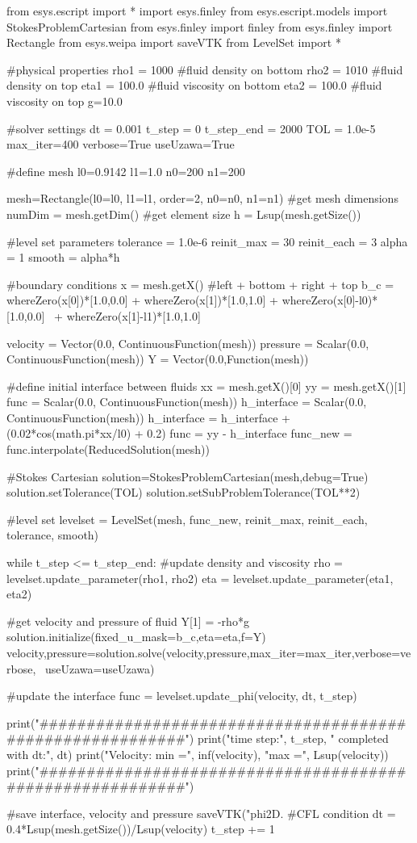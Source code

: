 \begin{python}

from esys.escript import *
import esys.finley
from esys.escript.models import StokesProblemCartesian
from esys.finley import finley
from esys.finley import Rectangle
from esys.weipa import saveVTK
from LevelSet import *

#physical properties
rho1 = 1000		#fluid density on bottom
rho2 = 1010		#fluid density on top
eta1 = 100.0		#fluid viscosity on bottom
eta2 = 100.0		#fluid viscosity on top
g=10.0

#solver settings
dt = 0.001
t_step = 0
t_step_end = 2000
TOL = 1.0e-5
max_iter=400
verbose=True
useUzawa=True

#define mesh
l0=0.9142
l1=1.0
n0=200      
n1=200

mesh=Rectangle(l0=l0, l1=l1, order=2, n0=n0, n1=n1)
#get mesh dimensions
numDim = mesh.getDim()
#get element size
h = Lsup(mesh.getSize())

#level set parameters
tolerance = 1.0e-6
reinit_max = 30
reinit_each = 3
alpha = 1
smooth = alpha*h 

#boundary conditions
x = mesh.getX()
#left + bottom + right + top
b_c = whereZero(x[0])*[1.0,0.0] + whereZero(x[1])*[1.0,1.0] + whereZero(x[0]-l0)*[1.0,0.0] \
      + whereZero(x[1]-l1)*[1.0,1.0]

velocity = Vector(0.0, ContinuousFunction(mesh))
pressure = Scalar(0.0, ContinuousFunction(mesh))
Y = Vector(0.0,Function(mesh))

#define initial interface between fluids
xx = mesh.getX()[0]
yy = mesh.getX()[1]
func = Scalar(0.0, ContinuousFunction(mesh))
h_interface = Scalar(0.0, ContinuousFunction(mesh))
h_interface = h_interface + (0.02*cos(math.pi*xx/l0) + 0.2)
func = yy - h_interface
func_new = func.interpolate(ReducedSolution(mesh))

#Stokes Cartesian
solution=StokesProblemCartesian(mesh,debug=True)
solution.setTolerance(TOL)
solution.setSubProblemTolerance(TOL**2)

#level set
levelset = LevelSet(mesh, func_new, reinit_max, reinit_each, tolerance, smooth)    

while t_step <= t_step_end:
  #update density and viscosity
  rho = levelset.update_parameter(rho1, rho2)
  eta = levelset.update_parameter(eta1, eta2)

  #get velocity and pressure of fluid
  Y[1] = -rho*g
  solution.initialize(fixed_u_mask=b_c,eta=eta,f=Y)
  velocity,pressure=solution.solve(velocity,pressure,max_iter=max_iter,verbose=verbose, \ 
  useUzawa=useUzawa)
  
  #update the interface
  func = levelset.update_phi(velocity, dt, t_step)  

  print("##########################################################")
  print("time step:", t_step, " completed with dt:", dt)
  print("Velocity: min =", inf(velocity), "max =", Lsup(velocity))
  print("##########################################################")
 
  #save interface, velocity and pressure 
  saveVTK("phi2D.%
  #CFL condition
  dt = 0.4*Lsup(mesh.getSize())/Lsup(velocity)
  t_step += 1

\end{python}
